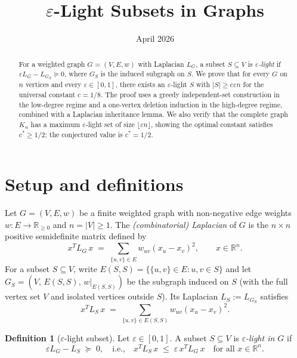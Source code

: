 \documentclass[12pt]{article}
\title{$\varepsilon$-Light Subsets in Graphs}
\author{}
\date{April 2026}
\theoremstyle{definition}
\newtheorem{definition}[theorem]{Definition}
\begin{document}
\maketitle

\begin{abstract}
For a weighted graph $G=(V,E,w)$ with Laplacian $L_G$, a subset $S\subseteq V$
is \emph{$\varepsilon$-light} if $\varepsilon L_G - L_{G_S}\succeq 0$, where $G_S$ is the
induced subgraph on $S$.  We prove that for every $G$ on $n$ vertices and every
$\varepsilon\in[0,1]$, there exists an $\varepsilon$-light $S$ with $|S|\ge c\varepsilon n$ for the
universal constant $c=1/8$.  The proof uses a greedy independent-set
construction in the low-degree regime and a one-vertex deletion induction in the
high-degree regime, combined with a Laplacian inheritance lemma.
We also verify that the complete graph $K_n$ has a maximum $\varepsilon$-light set of
size $\lfloor\varepsilon n\rfloor$, showing the optimal constant satisfies $c^*\ge1/2$;
the conjectured value is $c^*=1/2$.
\end{abstract}

\tableofcontents

\section{Setup and definitions}

Let $G=(V,E,w)$ be a finite weighted graph with non-negative edge weights
$w:E\to\mathbb{R}_{\ge 0}$ and $n=|V|\ge 1$.  The \emph{(combinatorial) Laplacian}
of $G$ is the $n\times n$ positive semidefinite matrix defined by
\[
   x^T L_G\, x \;=\; \sum_{\{u,v\}\in E} w_{uv}(x_u - x_v)^2,
   \qquad x\in\mathbb{R}^n.
\]
For a subset $S\subseteq V$, write $E(S,S)=\{\{u,v\}\in E : u,v\in S\}$ and
let $G_S=(V,\,E(S,S),\,w|_{E(S,S)})$ be the subgraph induced on $S$ (with
the full vertex set $V$ and isolated vertices outside $S$).
Its Laplacian $L_S := L_{G_S}$ satisfies
\[
   x^T L_S\, x \;=\; \sum_{\{u,v\}\in E(S,S)} w_{uv}(x_u - x_v)^2.
\]

\begin{definition}[$\varepsilon$-light subset]
Let $\varepsilon\in[0,1]$.  A subset $S\subseteq V$ is \emph{$\varepsilon$-light in $G$} if
\[
   \varepsilon L_G - L_S \;\succeq\; 0,
   \quad\text{i.e.,}\quad
   x^T L_S\, x \;\le\; \varepsilon\, x^T L_G\, x
   \quad\text{for all }x\in\mathbb{R}^n.
\]
\end{definition}
\end{document}
